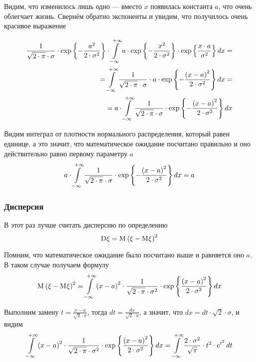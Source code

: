 Видим, что изменилось лишь одно --- вместо $x$ появилась константа $a$,
что очень облегчает жизнь.
Свернём обратно экспоненты и увидим, что получилось очень красивое выражение

\begin{align*}
    \frac{1}{\sqrt{2 \cdot \pi} \cdot \sigma}
            \cdot \exp{\left\{ - \frac{a^2}{2 \cdot \sigma^2} \right\}}
            \cdot \integral{-\infty}{+\infty}{x}{
                a \cdot \exp{\left\{ - \frac{x^2}{2 \cdot \sigma^2} \right\}}
                \cdot \exp{\left\{ \frac{x \cdot a}{\sigma^2} \right\}}} = \\
        = \integral{-\infty}{+\infty}{x}{
            \frac{1}{\sqrt{2 \cdot \pi} \cdot \sigma}
                \cdot a \cdot \exp{\left\{
                    -\frac{\left( x-a \right)^2}
                        {2 \cdot \sigma^2} \right\}}} = \\
        = a \cdot \integral{-\infty}{+\infty}{x}{
            \frac{1}{\sqrt{2 \cdot \pi} \cdot \sigma}
                \cdot \exp{\left\{
                    -\frac{\left( x-a \right)^2}{2 \cdot \sigma^2} \right\}}}
\end{align*}

Видим интеграл от плотности нормального распределения, который равен единице,
а это значит, что математическое ожидание посчитано правильно
и оно действительно равно первому параметру $a$
$$a \cdot \integral{-\infty}{+\infty}{x}{
            \frac{1}{\sqrt{2 \cdot \pi} \cdot \sigma}
                \cdot \exp{\left\{
                    -\frac{\left( x-a \right)^2}{2 \cdot \sigma^2} \right\}}}
    = a$$
\subsubsection{Дисперсия}
В этот раз лучше считать дисперсию по определению
$$\dispersion{\xi}
    = \mean{\left( \xi - \mean{\xi} \right)^2}$$

Помним, что математическое ожидание было посчитано выше и равняется оно $a$.
В таком случае получаем формулу
$$\mean{\left( \xi - \mean{\xi} \right)^2}
    = \integral{-\infty}{+\infty}{x}{
        \left( x - a \right)^2
        \cdot \frac{1}{\sqrt{2 \cdot \pi} \cdot \sigma^2}
        \cdot \exp{ \left\{ \frac{\left( x - a \right)^2}
            {2 \cdot \sigma^2} \right\}}}$$

Выполним замену $t=\frac{x-a}{\sqrt{2} \cdot \sigma}$, тогда
$dt=\frac{dx}{\sqrt{2} \cdot \sigma}$,
а значит, что $dx = dt \cdot \sqrt{2} \cdot \sigma$, и видим
$$\integral{-\infty}{+\infty}{x}{
        \left( x - a \right)^2
        \cdot \frac{1}{\sqrt{2 \cdot \pi} \cdot \sigma^2}
        \cdot \exp{ \left\{ \frac{\left( x - a \right)^2}
            {2 \cdot \sigma^2} \right\}}}
    = \integral{-\infty}{+\infty}{t}{
        \frac{2 \cdot \sigma^2}{\sqrt{\pi}}
        \cdot t^2 \cdot e^{t^2}}$$

